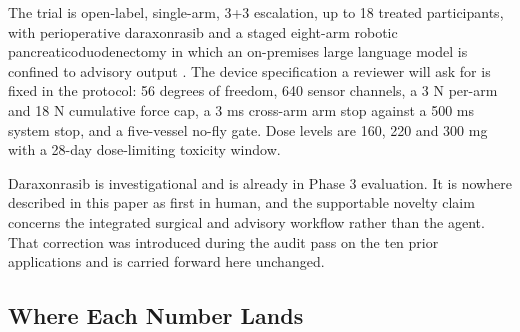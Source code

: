 The trial is open-label, single-arm, 3+3 escalation, up to 18 treated
participants, with perioperative daraxonrasib and a staged eight-arm robotic
pancreaticoduodenectomy in which an on-premises large language model is confined
to advisory output \cite{onpremwhippl,phase1ind}. The device specification a
reviewer will ask for is fixed in the protocol: 56 degrees of freedom, 640
sensor channels, a 3 N per-arm and 18 N cumulative force cap, a 3 ms cross-arm
arm stop against a 500 ms system stop, and a five-vessel no-fly gate. Dose
levels are 160, 220 and 300 mg with a 28-day dose-limiting toxicity window.

Daraxonrasib is investigational and is already in Phase 3 evaluation. It is
nowhere described in this paper as first in human, and the supportable novelty
claim concerns the integrated surgical and advisory workflow rather than the
agent. That correction was introduced during the audit pass on the ten prior
applications and is carried forward here unchanged.

\subsection{Where Each Number Lands}

